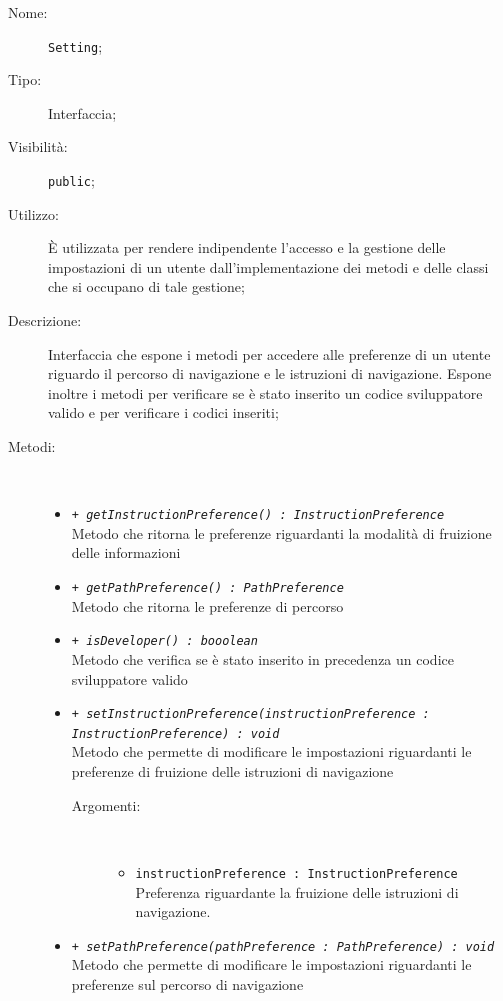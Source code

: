 \documentclass[../DefinizioneDiProdotto.tex]{subfiles}
\begin{document}
    \begin{description}
\item[Nome:] \texttt{Setting};
\item[Tipo:] Interfaccia;
\item[Visibilità:] \texttt{public};
\item[Utilizzo:] È utilizzata per rendere indipendente l'accesso e la gestione delle impostazioni di un utente dall'implementazione dei metodi e delle classi che si occupano di tale gestione;
\item[Descrizione:] Interfaccia che espone i metodi per accedere alle preferenze di un utente riguardo il percorso di navigazione e le istruzioni di navigazione. Espone inoltre i metodi per verificare se è stato inserito un codice sviluppatore valido e per verificare i codici inseriti;
\item[Metodi:] \
\begin{itemize}
\item \texttt{+ \textit{getInstructionPreference() : InstructionPreference}}\\
Metodo che ritorna le preferenze riguardanti la modalità di fruizione delle informazioni
 \item \texttt{+ \textit{getPathPreference() : PathPreference}}\\
Metodo che ritorna le preferenze di percorso
 \item \texttt{+ \textit{isDeveloper() : booolean}}\\
Metodo che verifica se è stato inserito in precedenza un codice sviluppatore valido
 \item \texttt{+ \textit{setInstructionPreference(instructionPreference : InstructionPreference) : void}}\\
Metodo che permette di modificare le impostazioni riguardanti le preferenze di fruizione delle istruzioni di navigazione
 \begin{description}
\item[Argomenti:] \
\begin{itemize}
\item \texttt{instructionPreference : InstructionPreference}\\
Preferenza riguardante la fruizione delle istruzioni di navigazione.\end{itemize}
\end{description}
\item \texttt{+ \textit{setPathPreference(pathPreference : PathPreference) : void}}\\
Metodo che permette di modificare le impostazioni riguardanti le preferenze sul percorso di navigazione

\end{itemize}
\end{description}
\end{document}

